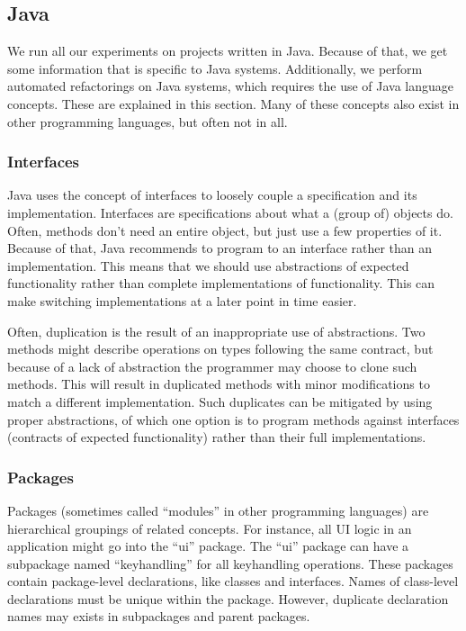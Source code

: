 \subsection{Java}
We run all our experiments on projects written in Java. Because of that, we get some information that is specific to Java systems. Additionally, we perform automated refactorings on Java systems, which requires the use of Java language concepts. These are explained in this section. Many of these concepts also exist in other programming languages, but often not in all.

\subsubsection{Interfaces}
Java uses the concept of interfaces to loosely couple a specification and its implementation. Interfaces are specifications about what a (group of) objects do. Often, methods don't need an entire object, but just use a few properties of it. Because of that, Java recommends to program to an interface rather than an implementation. This means that we should use abstractions of expected functionality rather than complete implementations of functionality. This can make switching implementations at a later point in time easier.

Often, duplication is the result of an inappropriate use of abstractions. Two methods might describe operations on types following the same contract, but because of a lack of abstraction the programmer may choose to clone such methods. This will result in duplicated methods with minor modifications to match a different implementation. Such duplicates can be mitigated by using proper abstractions, of which one option is to program methods against interfaces (contracts of expected functionality) rather than their full implementations.

\subsubsection{Packages}
Packages (sometimes called ``modules'' in other programming languages) are hierarchical groupings of related concepts. For instance, all UI logic in an application might go into the ``ui'' package. The ``ui'' package can have a subpackage named ``keyhandling'' for all keyhandling operations. These packages contain package-level declarations, like classes and interfaces. Names of class-level declarations must be unique within the package. However, duplicate declaration names may exists in subpackages and parent packages.

